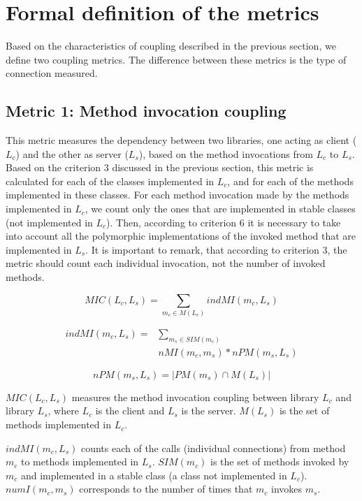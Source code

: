 \documentclass[a4paper]{article}
\begin{document}
\section{Formal definition of the metrics}
Based on the characteristics of coupling described in the previous section, we define two coupling metrics. The difference between these metrics is the type of connection measured.

\subsection{Metric 1: Method invocation coupling}
This metric measures the dependency between two libraries, one acting as client ($L_c$) and the other as server ($L_s$), based on the method invocations from $L_c$ to $L_s$. Based on the criterion 3 discussed in the previous section, this metric is calculated for each of the classes implemented in $L_c$, and for each of the methods implemented in these classes. For each method invocation made by the methods implemented in $L_c$, we count only the ones that are implemented in stable classes (not implemented in $L_c$). Then, according to criterion 6 it is necessary to take into account all the polymorphic implementations of the invoked method that are implemented in $L_s$. It is important to remark, that according to criterion 3, the metric should count each individual invocation, not the number of invoked methods.

\begin{equation}
    MIC(L_c, L_s) = \sum_{m_c \in M(L_c)} indMI(m_c, L_s)
\end{equation}

\begin{equation}
\begin{aligned}
    indMI(m_c, L_s) = &\sum_{m_s \in SIM(m_c)}\\& nMI(m_c, m_s)*nPM(m_s, L_s)
\end{aligned}
\end{equation}

\begin{equation}
    nPM(m_s, L_s) = |PM(m_s) \cap M(L_s)|
\end{equation}

$MIC(L_c, L_s)$ measures the method invocation coupling between library $L_c$ and library $L_s$, where $L_c$ is the client and $L_s$ is the server. $M(L_s)$ is the set of methods implemented in $L_c$.

$indMI(m_c, L_s)$ counts each of the calls (individual connections) from method $m_c$ to methods implemented in $L_s$. $SIM(m_c)$ is the set of methods invoked by $m_c$ and implemented in a stable class (a class not implemented in $L_c$). $numI(m_c, m_s)$ corresponds to the number of times that $m_c$ invokes $m_s$.
\end{document}

